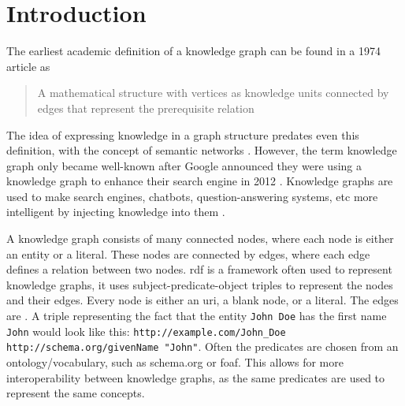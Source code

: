 
\chapter{Introduction}
\label{chapter:introduction}

The earliest academic definition of a knowledge graph can be found in a 1974 article as \begin{quote}
    A mathematical structure with vertices as knowledge units connected by edges that represent the prerequisite relation \citep{Marchi1974,bergman2019common}
\end{quote} 

The idea of expressing knowledge in a graph structure predates even this definition, with the concept of semantic networks \citep{Richens1956PreprogrammingFM}. %
However, the term knowledge graph only became well-known after Google announced they were using a knowledge graph to enhance their search engine in 2012 \citep{singhal2012introducing}. 
Knowledge graphs are used to make search engines, chatbots, question-answering systems, etc more intelligent by injecting knowledge into them \citep{SurveyOnKGs}. 

A knowledge graph consists of many connected nodes, where each node is either an entity or a literal. These nodes are connected by edges, where each edge defines a relation between two nodes. \acrshort{rdf} is a framework often used to represent knowledge graphs, it uses subject-predicate-object triples to represent the nodes and their edges. Every node is either an \acrshort{uri}, a blank node, or a literal. The edges are . A triple representing the fact that the entity \texttt{John Doe} has the first name \texttt{John} would look like this: \texttt{http://example.com/John\_Doe http://schema.org/givenName "John"}. Often the predicates are chosen from an ontology/vocabulary, such as schema.org or \acrshort{foaf}. This allows for more interoperability between knowledge graphs, as the same predicates are used to represent the same concepts.

